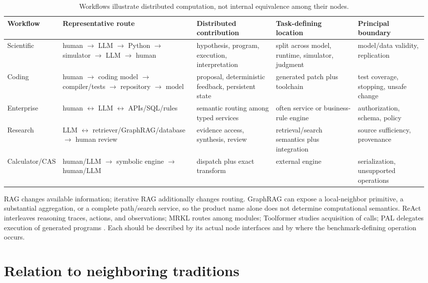 \documentclass[10pt]{article}
\begin{document}
\begin{table}[H]
\centering\scriptsize
\begin{tabularx}{\linewidth}{>{\raggedright\arraybackslash}p{.14\linewidth}>{\raggedright\arraybackslash}p{.31\linewidth}YYY}
\toprule
Workflow & Representative route & Distributed contribution & Task-defining location & Principal boundary\\
\midrule
Scientific & human $\to$ LLM $\to$ Python $\to$ simulator $\to$ LLM $\to$ human & hypothesis, program, execution, interpretation & split across model, runtime, simulator, judgment & model/data validity, replication\\
Coding & human $\to$ coding model $\to$ compiler/tests $\to$ repository $\to$ model & proposal, deterministic feedback, persistent state & generated patch plus toolchain & test coverage, stopping, unsafe change\\
Enterprise & human $\leftrightarrow$ LLM $\leftrightarrow$ APIs/SQL/rules & semantic routing among typed services & often service or business-rule engine & authorization, schema, policy\\
Research & LLM $\leftrightarrow$ retriever/GraphRAG/database $\to$ human review & evidence access, synthesis, review & retrieval/search semantics plus integration & source sufficiency, provenance\\
Calculator/CAS & human/LLM $\to$ symbolic engine $\to$ human/LLM & dispatch plus exact transform & external engine & serialization, unsupported operations\\
\bottomrule
\end{tabularx}
\caption{Workflows illustrate distributed computation, not internal equivalence among their nodes.}
\label{tab:workflows}
\end{table}

RAG changes available information; iterative RAG additionally changes routing. GraphRAG can expose a local-neighbor primitive, a substantial aggregation, or a complete path/search service, so the product name alone does not determine computational semantics. ReAct interleaves reasoning traces, actions, and observations; MRKL routes among modules; Toolformer studies acquisition of calls; PAL delegates execution of generated programs \cite{lewis2020,edge2024,yao2023,karpas2022,schick2023,gao2023}. Each should be described by its actual node interfaces and by where the benchmark-defining operation occurs.

\section{Relation to neighboring traditions}
\end{document}
